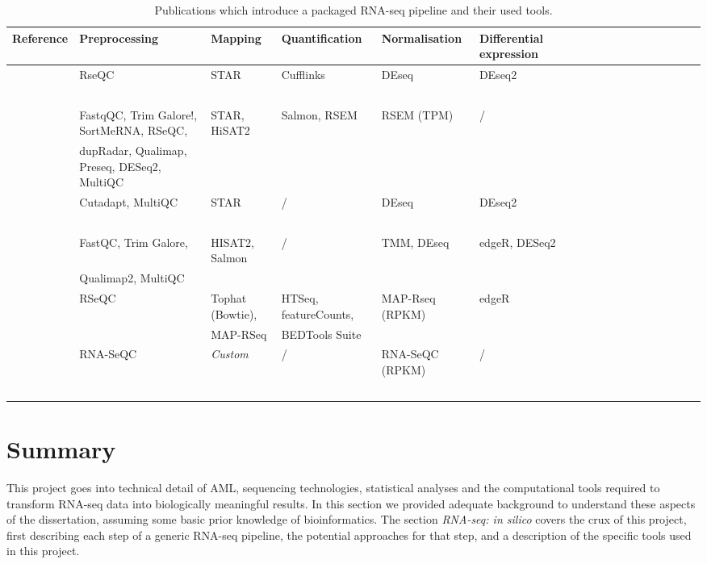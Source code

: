 \begin{landscape}
	\pagestyle{empty}
\begin{table}[h]
	\footnotesize
    \centering
    \captionsetup{font=footnotesize}
    \caption{Publications which introduce a packaged RNA-seq pipeline and their used tools.}
	\label{tab:packaged_pipelines}
    \begin{tabular}{llllllllllllllllll}
		\toprule
        \textbf{Reference} & \textbf{Preprocessing} & \textbf{Mapping} & \textbf{Quantification} & \textbf{Normalisation} &\textbf{ Differential expression} \\ \midrule
        \cite{cornwell2018viper} & RseQC & STAR & Cufflinks &  DEseq & DEseq2  \\ 
        ~ & ~ & ~ & ~ & ~ &   \\ \hline
        \cite{ewels2020nf} & FastqQC, Trim Galore!, SortMeRNA, RSeQC,  & STAR, HiSAT2 & Salmon, RSEM & RSEM (TPM) & /  \\ 
        ~ & dupRadar, Qualimap, Preseq, DESeq2, MultiQC & ~ & ~ & ~ &   \\ \hline
        \cite{koster2021snakemake} & Cutadapt, MultiQC & STAR & / &  DEseq & DEseq2  \\ 
        ~ & ~ & ~ & ~ & ~ &   \\ \hline
        \cite{zhang2020rasflow} & FastQC, Trim Galore,  & HISAT2, Salmon  & / & TMM,  DEseq & edgeR, DESeq2   \\ 
        ~ & Qualimap2, MultiQC  & ~ & ~ & ~ &   \\ \hline
        \cite{kalari2014map} & RSeQC & Tophat (Bowtie),  & HTSeq, featureCounts,  & MAP-Rseq (RPKM) & edgeR  \\ 
        ~ & ~ & MAP-RSeq & BEDTools Suite & ~ &   \\ \hline
        \cite{torres2014prada} & RNA-SeQC  & \textit{Custom} & / & RNA-SeQC (RPKM) & /  \\ 
        ~ & ~ & ~ & ~ & ~ &  \\ \bottomrule
    \end{tabular}
\end{table}
\end{landscape}


\clearpage
\section{Summary}
This project goes into technical detail of \ac{AML}, sequencing technologies, statistical analyses and the computational tools required to transform RNA-seq data into biologically meaningful results. In this section we provided adequate background to understand these aspects of the dissertation, assuming some basic prior knowledge of bioinformatics. The section \textit{RNA-seq: in silico} covers the crux of this project, first describing each step of a generic RNA-seq pipeline, the potential approaches for that step, and a description of the specific tools used in this project.

